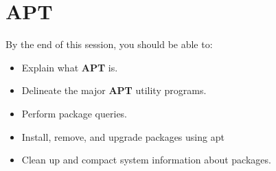 \chapter{APT}

\lflogo
\minitoc

\begin{lfbox}

   By the end of this session, you should be able to:

   \begin{itemize}
      \item Explain what \textbf{APT} is.
      \item Delineate the major \textbf{APT} utility programs.
      \item Perform package queries.
      \item Install, remove, and upgrade packages using apt
      \item Clean up and compact system information about
      packages.
   \end{itemize}

\end{lfbox}


\clearpage




